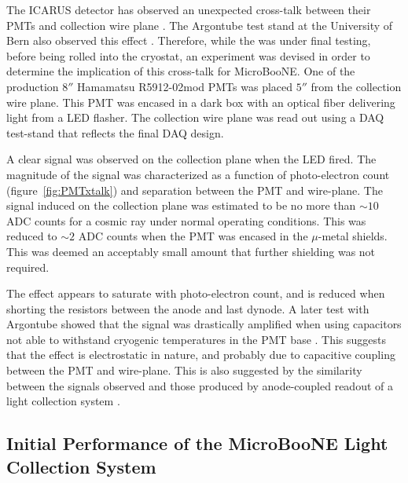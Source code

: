 The ICARUS detector has observed an unexpected cross-talk between their PMTs and collection wire plane \cite{Ankowski:2008aa}. The Argontube test stand at the University of Bern also observed this effect \cite{BernPrivate}.   Therefore, while the \lartpc was under final testing, before being rolled into the cryostat, an experiment was devised in order to determine the implication of this cross-talk for MicroBooNE.  One of the production $8''$ Hamamatsu R5912-02mod PMTs was placed $5''$ from the \lartpc collection wire plane. This PMT was encased in a dark box with an optical fiber delivering light from a LED flasher. The collection wire plane was read out using a DAQ test-stand that reflects the final DAQ design.

A clear signal was observed on the collection plane when the LED fired. The magnitude of the signal was characterized as a function of photo-electron count (figure~\ref{fig:PMTxtalk}) and separation between the PMT and wire-plane. The signal induced on the collection plane was estimated to be no more than $\sim10$ ADC counts for a cosmic ray under normal operating conditions. This was reduced to $\sim2$ ADC counts when the PMT was encased in the $\mu$-metal shields. This was deemed an acceptably small amount that further shielding was not required.

The effect appears to saturate with photo-electron count, and is reduced when shorting the resistors between the anode and last dynode. A later test with Argontube showed that the signal was drastically amplified when using capacitors not able to withstand cryogenic temperatures in the PMT base \cite{BernPrivate}. This suggests that the effect is electrostatic in nature, and probably due to capacitive coupling between the PMT and wire-plane.  This is also suggested by the similarity between the signals observed and those produced by anode-coupled readout of a light collection system \cite{Moss:2015hha}.

\subsection{Initial Performance of the MicroBooNE Light Collection System}

